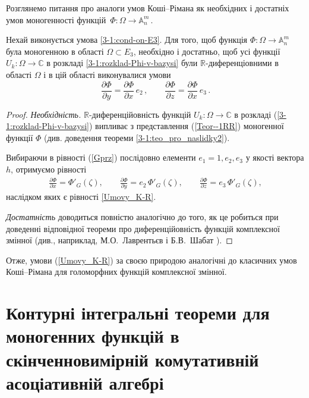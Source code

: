 \documentclass[11pt, reqno]{amsart}
\begin{document}
Розглянемо питання про аналоги умов Коші--Рімана як необхідних і достатніх умов моногенності
функцій\, $\Phi : \Omega\rightarrow \mathbb{A}_n^m$\,.


\begin{theorem}\label{3-1:teo-CR-An}
Нехай виконується умова \eqref{3-1:cond-on-E3}.
Для того, щоб функція $\Phi : \Omega\rightarrow \mathbb{A}_n^m$ була моногенною в області
$\Omega\subset E_3$, необхідно і достатньо, щоб усі функції
 $U_k:\Omega\rightarrow\mathbb{C}$ в розкладі \eqref{3-1:rozklad-Phi-v-bazysi} були $\mathbb{R}$-диференціовними в
області $\Omega$ і в цій області виконувалися умови
\begin{equation}\label{Umovy_K-R}
\frac{\partial \Phi}{\partial y}=\frac{\partial \Phi}{\partial
x}\,e_{2}\,,\qquad \frac{\partial \Phi}{\partial z}=\frac{\partial
\Phi}{\partial x}\,e_{3}\,.
\end{equation}
\end{theorem}

\begin{proof} {\it Необхідність.} $\mathbb{R}$-диференційовність функцій
$U_k:\Omega\rightarrow\mathbb{C}$ в розкладі (\ref{3-1:rozklad-Phi-v-bazysi}) випливає
з представлення (\ref{Teor--1RR}) моногенної функції $\Phi$ (див. доведення теореми \ref{3-1:teo_pro_naslidky2}).

Вибираючи в рівності (\ref{Gprz}) послідовно елементи $e_{1}=1, e_{2}, e_{3}$ у якості вектора $h$,
отримуємо рівності
\begin{eqnarray*}
 \frac{\partial\Phi}{\partial x}=\Phi'_G(\zeta),\qquad
 \frac{\partial\Phi}{\partial y}=e_2\,\Phi'_G(\zeta),\qquad
\frac{\partial\Phi}{\partial z}=e_3\,\Phi'_G(\zeta),
\end{eqnarray*}
наслідком яких є рівності \eqref{Umovy_K-R}.

{\it Достатність} доводиться повністю аналогічно до того, як це робиться при доведенні
відповідної теореми про диференційовність функцій комплексної змінної
(див., наприклад, М.О.~Лаврентьєв і Б.В.~Шабат \cite[с.~21]{L1}).
\end{proof}

Отже, умови (\ref{Umovy_K-R}) за своєю природою аналогічні до класичних умов Коші--Рімана для
голоморфних функцій комплексної змінної.






\section{Контурні інтегральні теореми для моногенних функцій в скінченновимірній комутативній асоціативній алгебрі}
\end{document}
